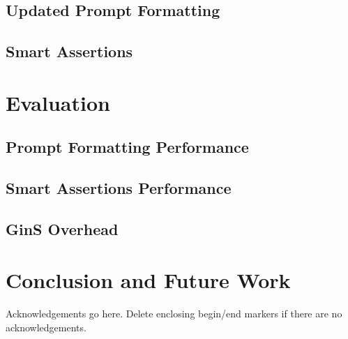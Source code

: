 \documentclass[sigconf]{acmart}
\begin{document}
\subsection{Updated Prompt Formatting}

\subsection{Smart Assertions}

\section{Evaluation}

\subsection{Prompt Formatting Performance}

\subsection{Smart Assertions Performance}

\subsection{GinS Overhead}

\section{Conclusion and Future Work}

\begin{acks}
Acknowledgements go here. Delete enclosing begin/end markers if there are no acknowledgements.
\end{acks}




\end{document}
